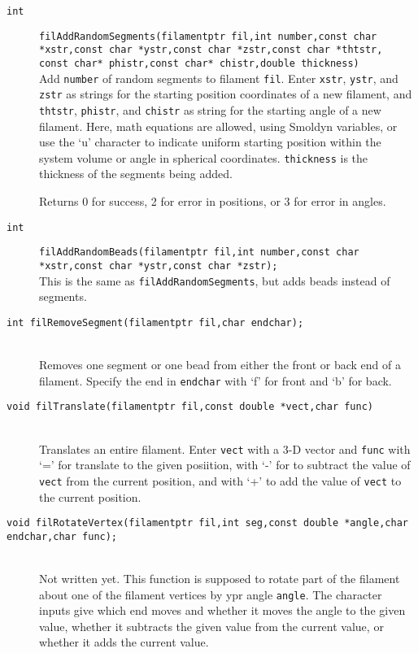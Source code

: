 \documentclass {scrbook}
\newcommand {\ttt} {\texttt}
\begin{document}
\begin{description}
\item[\ttt{int}]
\ttt{filAddRandomSegments(filamentptr fil,int number,const char *xstr,const char *ystr,const char *zstr,const char *thtstr, const char* phistr,const char* chistr,double thickness)}
\hfill \\
Add \ttt{number} of random segments to filament \ttt{fil}. Enter \ttt{xstr}, \ttt{ystr}, and \ttt{zstr} as strings for the starting position coordinates of a new filament, and \ttt{thtstr}, \ttt{phistr}, and \ttt{chistr} as string for the starting angle of a new filament. Here, math equations are allowed, using Smoldyn variables, or use the `u' character to indicate uniform starting position within the system volume or angle in spherical coordinates. \ttt{thickness} is the thickness of the segments being added.

Returns 0 for success, 2 for error in positions, or 3 for error in angles.

\item[\ttt{int}]
\ttt{filAddRandomBeads(filamentptr fil,int number,const char *xstr,const char *ystr,const char *zstr);}
\hfill \\
This is the same as \ttt{filAddRandomSegments}, but adds beads instead of segments.

\item[\ttt{int filRemoveSegment(filamentptr fil,char endchar);}]
\hfill \\
Removes one segment or one bead from either the front or back end of a filament. Specify the end in \ttt{endchar} with `f' for front and `b' for back.

\item[\ttt{void filTranslate(filamentptr fil,const double *vect,char func)}]
\hfill \\
Translates an entire filament. Enter \ttt{vect} with a 3-D vector and \ttt{func} with `=' for translate to the given posiition, with `-' for to subtract the value of \ttt{vect} from the current position, and with `+' to add the value of \ttt{vect} to the current position.

\item[\ttt{void filRotateVertex(filamentptr fil,int seg,const double *angle,char endchar,char func);}]
\hfill \\
Not written yet. This function is supposed to rotate part of the filament about one of the filament vertices by ypr angle \ttt{angle}. The character inputs give which end moves and whether it moves the angle to the given value, whether it subtracts the given value from the current value, or whether it adds the current value.


\end{description}
\end{document}
